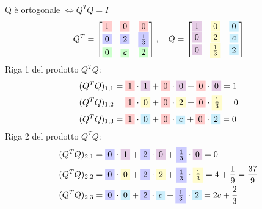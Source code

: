 \documentclass[12pt,a4paper]{article}
\begin{document}
\vspace{1em}
Q è ortogonale $\iff Q^T Q = I$
\[
Q^T =
\begin{bmatrix}
\colorbox{red!20}{$1$} & \colorbox{red!20}{$0$} & \colorbox{red!20}{$0$} \\
\colorbox{blue!20}{$0$} & \colorbox{blue!20}{$2$} & \colorbox{blue!20}{$\frac{1}{3}$} \\
\colorbox{green!20}{$0$} & \colorbox{green!20}{$c$} & \colorbox{green!20}{$2$}
\end{bmatrix}, \quad
Q =
\begin{bmatrix}
\colorbox{violet!20}{$1$} & \colorbox{yellow!20}{$0$} & \colorbox{cyan!20}{$0$} \\
\colorbox{violet!20}{$0$} & \colorbox{yellow!20}{$2$} & \colorbox{cyan!20}{$c$} \\
\colorbox{violet!20}{$0$} & \colorbox{yellow!20}{$\frac{1}{3}$} & \colorbox{cyan!20}{$2$}
\end{bmatrix}
\]
\vspace{1em}
\noindent
Riga 1 del prodotto $Q^T Q$:
\[
\begin{aligned}
(Q^T Q)_{1,1} &= \colorbox{red!20}{$1$} \cdot \colorbox{violet!20}{$1$} + \colorbox{red!20}{$0$} \cdot \colorbox{violet!20}{$0$} + \colorbox{red!20}{$0$} \cdot \colorbox{violet!20}{$0$} = 1 \\
(Q^T Q)_{1,2} &= \colorbox{red!20}{$1$} \cdot \colorbox{yellow!20}{$0$} + \colorbox{red!20}{$0$} \cdot \colorbox{yellow!20}{$2$} + \colorbox{red!20}{$0$} \cdot \colorbox{yellow!20}{$\frac{1}{3}$} = 0 \\
(Q^T Q)_{1,3} &= \colorbox{red!20}{$1$} \cdot \colorbox{cyan!20}{$0$} + \colorbox{red!20}{$0$} \cdot \colorbox{cyan!20}{$c$} + \colorbox{red!20}{$0$} \cdot \colorbox{cyan!20}{$2$} = 0
\end{aligned}
\]
\vspace{1em}
\noindent
Riga 2 del prodotto $Q^T Q$:
\[
\begin{aligned}
(Q^T Q)_{2,1} &= \colorbox{blue!20}{$0$} \cdot \colorbox{violet!20}{$1$} + \colorbox{blue!20}{$2$} \cdot \colorbox{violet!20}{$0$} + \colorbox{blue!20}{$\frac{1}{3}$} \cdot \colorbox{violet!20}{$0$} = 0 \\
(Q^T Q)_{2,2} &= \colorbox{blue!20}{$0$} \cdot \colorbox{yellow!20}{$0$} + \colorbox{blue!20}{$2$} \cdot \colorbox{yellow!20}{$2$} + \colorbox{blue!20}{$\frac{1}{3}$} \cdot \colorbox{yellow!20}{$\frac{1}{3}$} = 4 + \frac{1}{9} = \frac{37}{9} \\
(Q^T Q)_{2,3} &= \colorbox{blue!20}{$0$} \cdot \colorbox{cyan!20}{$0$} + \colorbox{blue!20}{$2$} \cdot \colorbox{cyan!20}{$c$} + \colorbox{blue!20}{$\frac{1}{3}$} \cdot \colorbox{cyan!20}{$2$} = 2c + \frac{2}{3}
\end{aligned}
\]
\end{document}
